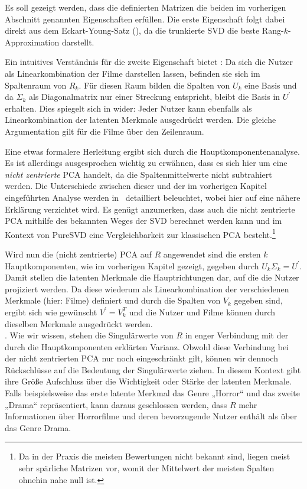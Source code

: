 \begin{derivation}
    Es soll gezeigt werden, dass die definierten Matrizen die beiden im vorherigen Abschnitt genannten Eigenschaften erfüllen.
    Die erste Eigenschaft folgt dabei direkt aus dem Eckart-Young-Satz (), da die trunkierte SVD die beste Rang-\(k\)-Approximation darstellt.  

    Ein intuitives Verständnis für die zweite Eigenschaft bietet :
    Da sich die Nutzer als Linearkombination der Filme darstellen lassen, befinden sie sich im Spaltenraum von \(R_{k}\). 
    Für diesen Raum bilden die Spalten von \(U_{k}\) eine Basis und da \(\Sigma_{k}\) als Diagonalmatrix nur einer Streckung entspricht, bleibt die Basis in \(U^{'}\) erhalten.
    Dies spiegelt sich in  wider:
    Jeder Nutzer kann ebenfalls als Linearkombination der latenten Merkmale ausgedrückt werden.
    Die gleiche Argumentation gilt für die Filme über den Zeilenraum.

    Eine etwas formalere Herleitung ergibt sich durch die Hauptkomponentenanalyse.
    Es ist allerdings ausgesprochen wichtig zu erwähnen, dass es sich hier um eine \emph{nicht zentrierte} PCA handelt, da die Spaltenmittelwerte nicht subtrahiert werden.
    Die Unterschiede zwischen dieser und der im vorherigen Kapitel eingeführten Analyse werden in~\cite{cadimaRelationshipsUncentredColumnCentred2009} detailliert beleuchtet, wobei hier auf eine nähere Erklärung verzichtet wird.
    Es genügt anzumerken, dass auch die nicht zentrierte PCA mithilfe des bekannten Weges der SVD berechnet werden kann und im Kontext von PureSVD eine Vergleichbarkeit zur klassischen PCA besteht.\footnote{Da in der Praxis die meisten Bewertungen nicht bekannt sind, liegen meist sehr spärliche Matrizen vor, womit der Mittelwert der meisten Spalten ohnehin nahe null ist.}

    Wird nun die (nicht zentrierte) PCA auf \(R\) angewendet sind die ersten \(k\) Hauptkomponenten, wie im vorherigen Kapitel gezeigt, gegeben durch \(U_{k}\Sigma_{k} = U^{'}\).
    Damit stellen die latenten Merkmale die Hauptrichtungen dar, auf die die Nutzer projiziert werden.
    Da diese wiederum als Linearkombination der verschiedenen Merkmale (hier: Filme) definiert und durch die Spalten von \(V_{k}\) gegeben sind, ergibt sich wie gewünscht \(V^{'} = V_{k}^{T}\) und die Nutzer und Filme können durch dieselben Merkmale ausgedrückt werden.
    \vspace{6pt}\\
    .
    Wie wir wissen, stehen die Singulärwerte von \(R\) in enger Verbindung mit der durch die Hauptkomponenten erklärten Varianz.
    Obwohl diese Verbindung bei der nicht zentrierten PCA nur noch eingeschränkt gilt, können wir dennoch Rückschlüsse auf die Bedeutung der Singulärwerte ziehen.
    In diesem Kontext gibt ihre Größe Aufschluss über die Wichtigkeit oder Stärke der latenten Merkmale.
    Falls beispielsweise das erste latente Merkmal das Genre „Horror“ und das zweite „Drama“ repräsentiert, kann daraus geschlossen werden, dass \(R\) mehr Informationen über Horrorfilme und deren bevorzugende Nutzer enthält als über das Genre Drama. 
\end{derivation}
